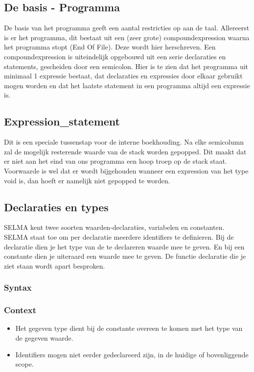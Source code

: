 \documentclass[]{article}
\begin{document}
\subsection{De basis - Programma}
De basis van het programma geeft een aantal restricties op aan de taal.
Allereerst is er het programma, dit bestaat uit een (zeer grote) compoundexpression waarna het programma stopt (End Of File). Deze wordt hier herschreven. Een compoundexpression is uiteindelijk opgebouwd uit een serie declaraties en statements, gescheiden door een semicolon. Hier is te zien dat het programma uit minimaal 1 expressie bestaat, dat declaraties en expressies door elkaar gebruikt mogen worden en dat het laatste statement in een programma altijd een expressie is.


\subsection{Expression\_statement}
Dit is een speciale tussenstap voor de interne boekhouding. Na elke semicolumn zal de mogelijk resterende waarde van de stack worden gepopped. Dit maakt dat er niet aan het eind van ons programma een hoop troep op de stack staat. Voorwaarde is wel dat er wordt bijgehouden wanneer een expression van het type void is, dan hoeft er namelijk niet gepopped te worden.


\subsection{Declaraties en types}
SELMA kent twee soorten waarden-declaraties, variabelen en constanten. SELMA staat toe om per declaratie meerdere identifiers te definieren. Bij de declaratie dien je het type van de te declareren waarde mee te geven. En bij een constante dien je uiteraard een waarde mee te geven.
De functie declaratie die je ziet staan wordt apart besproken.
\subsubsection{Syntax}

\subsubsection{Context}
\begin{itemize}
\item Het gegeven type dient bij de constante overeen te komen met het type van de gegeven waarde.
\item Identifiers mogen niet eerder gedeclareerd zijn, in de huidige of bovenliggende scope.
\end{itemize}
\end{document}

